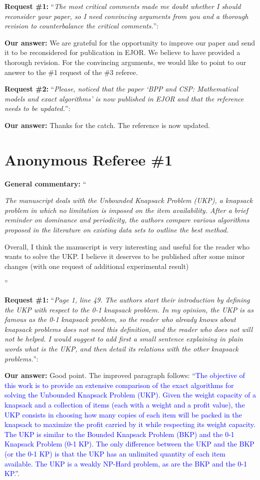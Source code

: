 \documentclass{elsarticle}
\begin{document}
\textbf{Request \#1:} ``\textit{The most critical comments made me doubt whether I should reconsider your paper, so I need convincing arguments from you and a thorough revision to counterbalance the critical comments.}'':

\textbf{Our answer:} We are grateful for the opportunity to improve our paper and send it to be reconsidered for publication in EJOR. We believe to have provided a thorough revision. For the convincing arguments, we would like to point to our answer to the \#1 request of the \#3 referee.

\textbf{Request \#2:} ``\textit{Please, noticed that the paper `BPP and CSP: Mathematical models and exact algorithms' is now published in EJOR and that the reference needs to be updated.}'':

\textbf{Our answer:} Thanks for the catch. The reference is now updated.

\section{Anonymous Referee \#1}

\textbf{General commentary:} ``{\itshape
The manuscript deals with the Unbounded Knapsack Problem (UKP), a knapsack problem in which no limitation is imposed on the item availability. After a brief reminder on dominance and periodicity, the authors compare various algorithms proposed in the literature on existing data sets to outline the best method.

Overall, I think the manuscript is very interesting and useful for the reader who wants to solve the UKP. I believe it deserves to be published after some minor changes (with one request of additional experimental result)
}''

\textbf{Request \#1:} ``\textit{Page 1, line 49. The authors start their introduction by defining the UKP with respect to the 0-1 knapsack problem. In my opinion, the UKP is as famous as the 0-1 knapsack problem, so the reader who already knows about knapsack problems does not need this definition, and the reader who does not will not be helped. I would suggest to add first a small sentence explaining in plain words what is the UKP, and then detail its relations with the other knapsack problems.}'':

\textbf{Our answer:} Good point. The improved paragraph follows: ``\textcolor{blue}{The objective of this work is to provide an extensive comparison of the exact algorithms for solving the Unbounded Knapsack Problem (UKP). Given the weight capacity of a knapsack and a collection of items (each with a weight and a profit value), the UKP consists in choosing how many copies of each item will be packed in the knapsack to maximize the profit carried by it while respecting its weight capacity. The UKP is similar to the Bounded Knapsack Problem (BKP) and the 0-1 Knapsack Problem (0-1 KP). The only difference between the UKP and the BKP (or the 0-1 KP) is that the UKP has an unlimited quantity of each item available. The UKP is a weakly NP-Hard problem, as are the BKP and the 0-1 KP.}''.
\medskip
\end{document}
